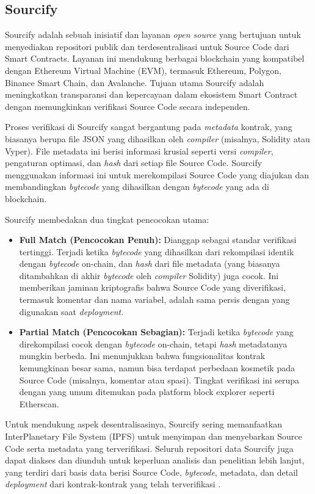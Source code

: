 \subsection{Sourcify}
\label{subsec:sourcify}

Sourcify adalah sebuah inisiatif dan layanan \textit{open source} yang bertujuan untuk menyediakan repositori publik dan terdesentralisasi untuk Source Code dari Smart Contracts. Layanan ini mendukung berbagai blockchain yang kompatibel dengan Ethereum Virtual Machine (EVM), termasuk Ethereum, Polygon, Binance Smart Chain, dan Avalanche. Tujuan utama Sourcify adalah meningkatkan transparansi dan kepercayaan dalam ekosistem Smart Contract dengan memungkinkan verifikasi Source Code secara independen.

Proses verifikasi di Sourcify sangat bergantung pada \textit{metadata} kontrak, yang biasanya berupa file JSON yang dihasilkan oleh \textit{compiler} (misalnya, Solidity atau Vyper). File metadata ini berisi informasi krusial seperti versi \textit{compiler}, pengaturan optimasi, dan \textit{hash} dari setiap file Source Code. Sourcify menggunakan informasi ini untuk merekompilasi Source Code yang diajukan dan membandingkan \textit{bytecode} yang dihasilkan dengan \textit{bytecode} yang ada di blockchain.

Sourcify membedakan dua tingkat pencocokan utama:
\begin{itemize}
    \item \textbf{Full Match (Pencocokan Penuh):} Dianggap sebagai standar verifikasi tertinggi. Terjadi ketika \textit{bytecode} yang dihasilkan dari rekompilasi identik dengan \textit{bytecode} on-chain, dan \textit{hash} dari file metadata (yang biasanya ditambahkan di akhir \textit{bytecode} oleh \textit{compiler} Solidity) juga cocok. Ini memberikan jaminan kriptografis bahwa Source Code yang diverifikasi, termasuk komentar dan nama variabel, adalah sama persis dengan yang digunakan saat \textit{deployment}.
    \item \textbf{Partial Match (Pencocokan Sebagian):} Terjadi ketika \textit{bytecode} yang direkompilasi cocok dengan \textit{bytecode} on-chain, tetapi \textit{hash} metadatanya mungkin berbeda. Ini menunjukkan bahwa fungsionalitas kontrak kemungkinan besar sama, namun bisa terdapat perbedaan kosmetik pada Source Code (misalnya, komentar atau spasi). Tingkat verifikasi ini serupa dengan yang umum ditemukan pada platform block explorer seperti Etherscan.
\end{itemize}

Untuk mendukung aspek desentralisasinya, Sourcify sering memanfaatkan InterPlanetary File System (IPFS) untuk menyimpan dan menyebarkan Source Code serta metadata yang terverifikasi. Seluruh repositori data Sourcify juga dapat diakses dan diunduh untuk keperluan analisis dan penelitian lebih lanjut, yang terdiri dari basis data berisi Source Code, \textit{bytecode}, metadata, dan detail \textit{deployment} dari kontrak-kontrak yang telah terverifikasi \parencite{sourcify_website}.